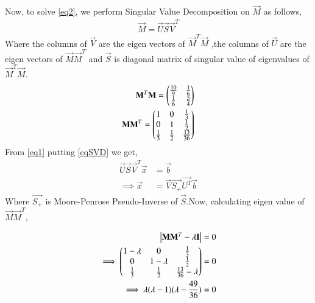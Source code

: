 \documentclass[journal,12pt,twocolumn]{IEEEtran}
\begin{document}
Now, to solve \eqref{eq2}, we perform Singular Value Decomposition on $\vec{M}$ as follows,
\begin{align}
\vec{M}=\vec{U}\vec{S}\vec{V}^T\label{eqSVD}
\end{align}
Where the columns of $\vec{V}$ are the eigen vectors of $\vec{M}^T\vec{M}$ ,the columns of $\vec{U}$ are the eigen vectors of $\vec{M}\vec{M}^T$ and $\vec{S}$ is diagonal matrix of singular value of eigenvalues of $\vec{M}^T\vec{M}$.
\begin{align}
\mathbf{M}^T\mathbf{M}=\begin{pmatrix}\frac{10}{9}& \frac{1}{6}\\ \frac{1}{6}&\frac{5}{4}\end{pmatrix}\label{eqMTM}\\
\mathbf{M}\mathbf{M}^T=\begin{pmatrix}1&0& \frac{1}{3}\\0&1& \frac{1}{2}\\ \frac{1}{3}& \frac{1}{2}& \frac{13}{36}\end{pmatrix}
\end{align}
From \eqref{eq1} putting \eqref{eqSVD} we get,
\begin{align}
\vec{U}\vec{S}\vec{V}^T\vec{x} & = \vec{b}\\
\implies\vec{x} &= \vec{V}\vec{S_+}\vec{U^T}\vec{b}\label{eqX}
\end{align}
Where $\vec{S_+}$ is Moore-Penrose Pseudo-Inverse of $\vec{S}$.Now, calculating eigen value of $\vec{M}\vec{M}^T$,


\begin{align}
\begin{vmatrix}\mathbf{M}\mathbf{M}^T - \lambda\mathbf{I}\end{vmatrix} &= 0\\
\implies\begin{pmatrix}1-\lambda&0& \frac{1}{3} \\0&1-\lambda& \frac{1}{2}\\   \frac{1}{3}& \frac{1}{2}&\frac{13}{36}-\lambda\end{pmatrix} &=0\\
\implies\lambda (\lambda - 1)(\lambda - \frac{49}{36}) &=0
\end{align}
\end{document}
